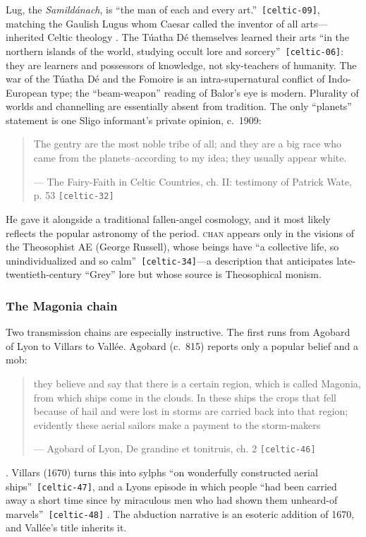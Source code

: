 \documentclass[11pt,a4paper]{article}
\newcommand{\pid}[1]{\texttt{\small #1}}
\begin{document}
Lug, the \emph{Samildánach}, is \enquote{the man of each and every art.}~\pid{[celtic-09]}, matching the Gaulish Lugus whom Caesar called the inventor of all arts---inherited Celtic theology \parencite{caesar_bg}. The Túatha Dé themselves learned their arts \enquote{in the northern islands of the world, studying occult lore and sorcery}~\pid{[celtic-06]}: they are learners and possessors of knowledge, not sky-teachers of humanity. The war of the Túatha Dé and the Fomoire is an intra-supernatural conflict of Indo-European type; the ``beam-weapon'' reading of Balor's eye is modern. Plurality of worlds and channelling are essentially absent from tradition. The only ``planets'' statement is one Sligo informant's private opinion, c.~1909: 
\begin{quote}\small The gentry are the most noble tribe of all; and they are a big race who came from the planets--according to my idea; they usually appear white.\par\hfill{\footnotesize --- The Fairy-Faith in Celtic Countries, ch. II: testimony of Patrick Wate, p. 53 \pid{[celtic-32]}}\end{quote}
 He gave it alongside a traditional fallen-angel cosmology, and it most likely reflects the popular astronomy of the period. \textsc{chan} appears only in the visions of the Theosophist AE (George Russell), whose beings have \enquote{a collective life, so unindividualized and so calm}~\pid{[celtic-34]}---a description that anticipates late-twentieth-century ``Grey'' lore but whose source is Theosophical monism.

\subsubsection{The Magonia chain}\label{sec:magonia}

Two transmission chains are especially instructive. The first runs from Agobard of Lyon to Villars to Vallée. Agobard (c.~815) reports only a popular belief and a mob: 
\begin{quote}\small they believe and say that there is a certain region, which is called Magonia, from which ships come in the clouds. In these ships the crops that fell because of hail and were lost in storms are carried back into that region; evidently these aerial sailors make a payment to the storm-makers\par\hfill{\footnotesize --- Agobard of Lyon, De grandine et tonitruis, ch. 2 \pid{[celtic-46]}}\end{quote}
 \parencite{agobard_lewis2001}. Villars (1670) turns this into sylphs \enquote{on wonderfully constructed aerial ships}~\pid{[celtic-47]}, and a Lyons episode in which people \enquote{had been carried away a short time since by miraculous men who had shown them unheard-of marvels}~\pid{[celtic-48]} \parencite{villars1670}. The abduction narrative is an esoteric addition of 1670, and Vallée's title inherits it.
\end{document}
